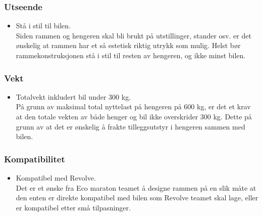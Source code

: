 \subsubsection{Utseende}
\begin{itemize}
\item Stå i stil til bilen. \\
Siden rammen og hengeren skal bli brukt på utstillinger, stander osv. er det ønskelig at rammen har et så estetisk riktig utrykk som mulig. Helst bør rammekonstruksjonen stå i stil til resten av hengeren, og ikke minst bilen. 
\end{itemize}
\subsubsection{Vekt}
\begin{itemize}
\item Totalvekt inkludert bil under 300 kg. \\
På grunn av maksimal total nyttelast på hengeren på 600 kg, er det et krav at den totale vekten av både henger og bil ikke overskrider 300 kg. Dette på grunn av at det er ønskelig å frakte tilleggsutstyr i hengeren sammen med bilen.  
\end{itemize}
\subsubsection{Kompatibilitet}
\begin{itemize}
\item Kompatibel med Revolve. \\
Det er et ønske fra Eco maraton teamet å designe rammen på en slik måte at den enten er direkte kompatibel med bilen som Revolve teamet skal lage, eller er kompatibel etter små tilpasninger. 
\end{itemize}
